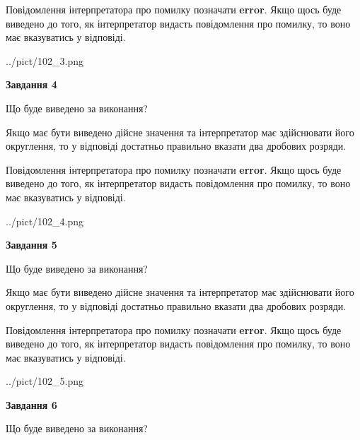 \documentclass[12pt, ukrainian]{article}
\begin{document}
{\begin {Large}
Повідомлення інтерпретатора про помилку позначати \textbf{error}.
Якщо щось буде виведено до того, як інтерпретатор видасть повідомлення про помилку, 
то воно має вказуватись у відповіді. \par

\begin{center}
	{../pict/102_3.png}
\end{center}
\newpage

{\begin {center}\textbf{Завдання 4}\end {center}}\par
Що буде виведено за виконання? \par

Якщо має бути виведено дійсне значення та інтерпретатор має здійснювати його округлення, 
то у відповіді достатньо правильно вказати два дробових розряди.

Повідомлення інтерпретатора про помилку позначати \textbf{error}.
Якщо щось буде виведено до того, як інтерпретатор видасть повідомлення про помилку, 
то воно має вказуватись у відповіді. \par

\begin{center}
	{../pict/102_4.png}
\end{center}
\newpage

{\begin {center}\textbf{Завдання 5}\end {center}}\par
Що буде виведено за виконання? \par

Якщо має бути виведено дійсне значення та інтерпретатор має здійснювати його округлення, 
то у відповіді достатньо правильно вказати два дробових розряди.

Повідомлення інтерпретатора про помилку позначати \textbf{error}.
Якщо щось буде виведено до того, як інтерпретатор видасть повідомлення про помилку, 
то воно має вказуватись у відповіді. \par

\begin{center}
	{../pict/102_5.png}
\end{center}
\newpage

{\begin {center}\textbf{Завдання 6}\end {center}}\par
Що буде виведено за виконання? \par


\end{Large}}
\end{document}
